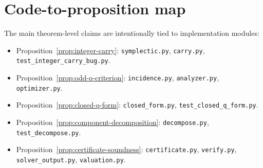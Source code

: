 \documentclass[11pt]{article}
\begin{document}
\section{Code-to-proposition map}

The main theorem-level claims are intentionally tied to implementation modules:
\begin{itemize}[leftmargin=*]
  \item Proposition~\ref{prop:integer-carry}: \texttt{symplectic.py}, \texttt{carry.py}, \texttt{test\_integer\_carry\_bug.py}.
  \item Proposition~\ref{prop:odd-q-criterion}: \texttt{incidence.py}, \texttt{analyzer.py}, \texttt{optimizer.py}.
  \item Proposition~\ref{prop:closed-q-form}: \texttt{closed\_form.py}, \texttt{test\_closed\_q\_form.py}.
  \item Proposition~\ref{prop:component-decomposition}: \texttt{decompose.py}, \texttt{test\_decompose.py}.
  \item Proposition~\ref{prop:certificate-soundness}: \texttt{certificate.py}, \texttt{verify.py}, \texttt{solver\_output.py}, \texttt{valuation.py}.
\end{itemize}



\end{document}
